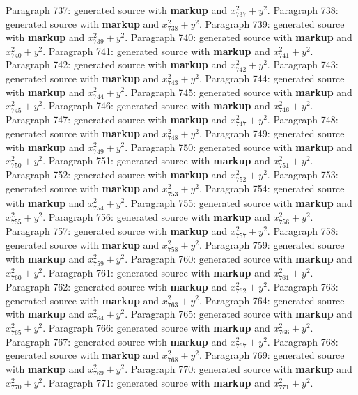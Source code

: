 \documentclass{article}
\begin{document}
Paragraph 737: generated source with \textbf{markup} and $x_{737}^2 + y^2$.
Paragraph 738: generated source with \textbf{markup} and $x_{738}^2 + y^2$.
Paragraph 739: generated source with \textbf{markup} and $x_{739}^2 + y^2$.
Paragraph 740: generated source with \textbf{markup} and $x_{740}^2 + y^2$.
Paragraph 741: generated source with \textbf{markup} and $x_{741}^2 + y^2$.
Paragraph 742: generated source with \textbf{markup} and $x_{742}^2 + y^2$.
Paragraph 743: generated source with \textbf{markup} and $x_{743}^2 + y^2$.
Paragraph 744: generated source with \textbf{markup} and $x_{744}^2 + y^2$.
Paragraph 745: generated source with \textbf{markup} and $x_{745}^2 + y^2$.
Paragraph 746: generated source with \textbf{markup} and $x_{746}^2 + y^2$.
Paragraph 747: generated source with \textbf{markup} and $x_{747}^2 + y^2$.
Paragraph 748: generated source with \textbf{markup} and $x_{748}^2 + y^2$.
Paragraph 749: generated source with \textbf{markup} and $x_{749}^2 + y^2$.
Paragraph 750: generated source with \textbf{markup} and $x_{750}^2 + y^2$.
Paragraph 751: generated source with \textbf{markup} and $x_{751}^2 + y^2$.
Paragraph 752: generated source with \textbf{markup} and $x_{752}^2 + y^2$.
Paragraph 753: generated source with \textbf{markup} and $x_{753}^2 + y^2$.
Paragraph 754: generated source with \textbf{markup} and $x_{754}^2 + y^2$.
Paragraph 755: generated source with \textbf{markup} and $x_{755}^2 + y^2$.
Paragraph 756: generated source with \textbf{markup} and $x_{756}^2 + y^2$.
Paragraph 757: generated source with \textbf{markup} and $x_{757}^2 + y^2$.
Paragraph 758: generated source with \textbf{markup} and $x_{758}^2 + y^2$.
Paragraph 759: generated source with \textbf{markup} and $x_{759}^2 + y^2$.
Paragraph 760: generated source with \textbf{markup} and $x_{760}^2 + y^2$.
Paragraph 761: generated source with \textbf{markup} and $x_{761}^2 + y^2$.
Paragraph 762: generated source with \textbf{markup} and $x_{762}^2 + y^2$.
Paragraph 763: generated source with \textbf{markup} and $x_{763}^2 + y^2$.
Paragraph 764: generated source with \textbf{markup} and $x_{764}^2 + y^2$.
Paragraph 765: generated source with \textbf{markup} and $x_{765}^2 + y^2$.
Paragraph 766: generated source with \textbf{markup} and $x_{766}^2 + y^2$.
Paragraph 767: generated source with \textbf{markup} and $x_{767}^2 + y^2$.
Paragraph 768: generated source with \textbf{markup} and $x_{768}^2 + y^2$.
Paragraph 769: generated source with \textbf{markup} and $x_{769}^2 + y^2$.
Paragraph 770: generated source with \textbf{markup} and $x_{770}^2 + y^2$.
Paragraph 771: generated source with \textbf{markup} and $x_{771}^2 + y^2$.
\end{document}
